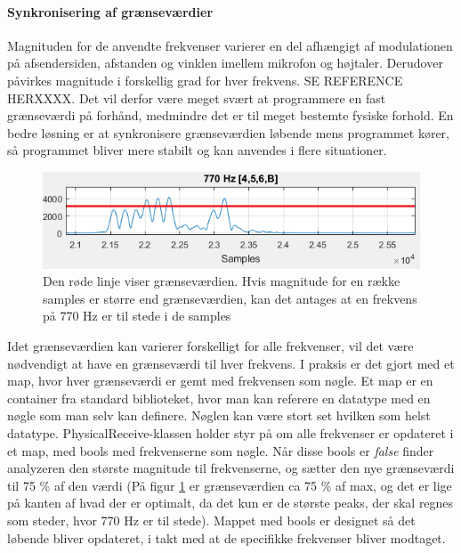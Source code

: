 \paragraph{Synkronisering af grænseværdier}\hfill \break

Magnituden for de anvendte frekvenser varierer en del afhængigt af modulationen på afsendersiden, afstanden og vinklen imellem mikrofon og højtaler. Derudover påvirkes magnitude i forskellig grad for hver frekvens. SE REFERENCE HERXXXX. Det vil derfor være meget svært at programmere en fast grænseværdi på forhånd, medmindre det er til meget bestemte fysiske forhold. En bedre løsning er at synkronisere grænseværdien løbende mens programmet kører, så programmet bliver mere stabilt og kan anvendes i flere situationer.

\begin{figure}[h!]
\centering
\includegraphics[scale=0.7]{Billeder/Threshold.PNG}
\caption{Den røde linje viser grænseværdien. Hvis magnitude for en række samples er større end grænseværdien, kan det antages at en frekvens på 770 Hz er til stede i de samples}
\label{fig:threshold}
\end{figure}

Idet grænseværdien kan varierer forskelligt for alle frekvenser, vil det være nødvendigt at have en grænseværdi til hver frekvens. I praksis er det gjort med et map, hvor hver grænseværdi er gemt med frekvensen som nøgle. Et map er en container fra standard biblioteket, hvor man kan referere en datatype med en nøgle som man selv kan definere. Nøglen kan være stort set hvilken som helst datatype. PhysicalReceive-klassen holder styr på om alle frekvenser er opdateret i et map, med bools med frekvenserne som nøgle. Når disse bools er \textit{false} finder analyzeren den største magnitude til frekvenserne, og sætter den nye grænseværdi til 75 \% af den værdi (På figur \ref{fig:threshold} er grænseværdien ca 75 \% af max, og det er lige på kanten af hvad der er optimalt, da det kun er de største peaks, der skal regnes som steder, hvor 770 Hz er til stede). Mappet med bools er designet så det løbende bliver opdateret, i takt med at de specifikke frekvenser bliver modtaget. 

